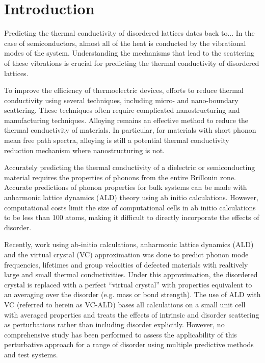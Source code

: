 \documentclass[aps,prb,onecolumn,preprint,superscriptaddress,amsmath,amssymb,floatfix]{revtex4}
\begin{document}
\section{\label{S:Introduction}Introduction}

Predicting the thermal conductivity of disordered lattices dates back to...
In the case of semiconductors, almost all of the heat is conducted by
the vibrational modes of the system. Understanding the mechanisms that lead 
to the scattering of these vibrations is crucial for predicting the 
thermal conductivity of disordered lattices.

To improve the efficiency of thermoelectric devices, 
efforts to reduce thermal conductivity using several techniques, 
including 
micro- and nano-boundary scattering. These techniques often require 
complicated nanostructuring and manufacturing techniques. 
Alloying remains an effective method to reduce the thermal conductivity 
of materials. In particular, for materials with short phonon mean free path 
spectra, alloying is still a potential thermal conductivity reduction 
mechanism where nanostructuring is not.\cite{tian_phonon_2012}

Accurately predicting the thermal conductivity of a dielectric or 
semiconducting material requires the properties of phonons from the entire 
Brillouin zone. Accurate predictions of phonon properties for bulk systems 
can be made with anharmonic lattice dynamics (ALD) theory 
using ab initio 
calculations.\cite{ward_intrinsic_2010,lindsay_thermal_2012,
garg_role_2011,
shiga_microscopic_2012,tian_phonon_2012,
shiomi_thermal_2011,esfarjani_heat_2011}
However, computational costs limit the size of computational cells 
in ab initio calculations to be less than 100 atoms, making it difficult 
to directly incorporate the effects of disorder.
\cite{koker_thermal_2009,bao_first-principles_2012,
lindsay_thermal_2012,tian_phonon_2012,garg_role_2011}

Recently, work using ab-initio calculations, anharmonic 
lattice dynamics (ALD) and the virtual crystal (VC) 
approximation was done to predict phonon mode frequencies, lifetimes and 
group velocities of defected materials with realtively
large\cite{garg_role_2011,lindsay_thermal_2012} 
and 
small\cite{tian_phonon_2012} 
thermal conductivities. 
Under this approximation, the disordered 
crystal is replaced with a perfect “virtual crystal” with properties 
equivalent to an averaging over the disorder (e.g. mass or bond 
strength).\cite{abeles_lattice_1963}
The use of ALD with VC (referred to herein as VC-ALD) bases 
all calculations on a small unit cell with averaged properties and 
treats the effects of intrinsic and disorder scattering as perturbations 
rather than including disorder explicitly.
\cite{abeles_lattice_1963,tamura_isotope_1983,
tian_phonon_2012,lindsay_thermal_2012} 
However, no comprehensive study has been performed 
to assess the applicability of this perturbative approach for a range 
of disorder using multiple predictive methods and test systems.
\end{document}
